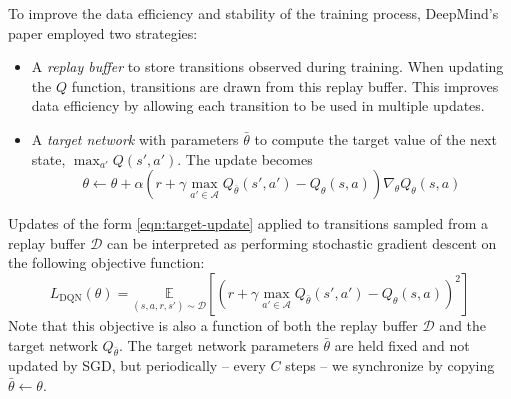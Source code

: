\documentclass{article}
\begin{document}
To improve the data efficiency and stability of the training process, DeepMind's paper \cite{mnih2015human} employed two strategies:
\begin{itemize}
	\item A \textit{replay buffer} to store transitions observed during training. When updating the $Q$ function, transitions are drawn from this replay buffer. This improves data efficiency by allowing each transition to be used in multiple updates.
	
	\item A \textit{target network} with parameters $\bar{\theta}$ to compute the target value of the next state, $\max_{a'} Q(s',a')$. The update becomes
	\begin{equation}
	\theta \leftarrow \theta + \alpha\left(r+\gamma \max_{a' \in \mathcal{A}}Q_{\bar{\theta}}\left(s', a'\right) - Q_{\theta}(s, a)\right) \nabla_{\theta} Q_{\theta}(s, a) \label{eqn:target-update}
	\end{equation}
\end{itemize}

Updates of the form \eqref{eqn:target-update} applied to transitions sampled from a replay buffer $\mathcal{D}$ can be interpreted as performing stochastic gradient descent on the following objective function: 
\begin{equation}
L_{\text{DQN}}(\theta) = \underset{(s,a,r,s') \sim \mathcal{D}}{\mathbb{E}}\left[\left(r+\gamma \max_{a' \in \mathcal{A}}Q_{\bar{\theta}}(s', a') - Q_{\theta}(s, a)\right)^2\right] \label{eqn:brm}
\end{equation}
Note that this objective is also a function of both the replay buffer $\mathcal{D}$ and the target network $Q_{\bar{\theta}}$.
The target network parameters $\bar{\theta}$ are held fixed and not updated by SGD, but periodically -- every $C$ steps -- we synchronize by copying $\bar{\theta} \leftarrow \theta$.\\
\end{document}
